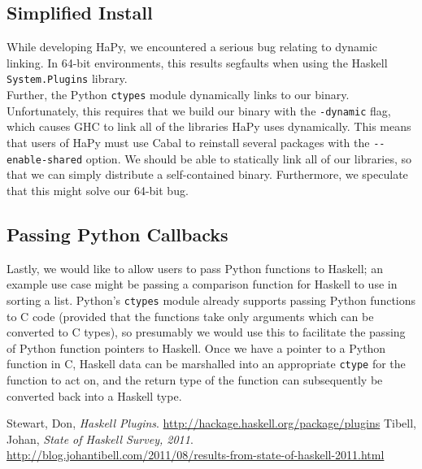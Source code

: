 \documentclass[11pt, letterpaper, oneside, twocolumn] {article}
\begin{document}
\subsection{Simplified Install}\label{sec:simple_install}
While developing HaPy, we encountered a serious bug relating to dynamic linking. In 64-bit environments, this results segfaults when using the Haskell \verb!System.Plugins! library. \\
Further, the Python \verb!ctypes! module dynamically links to our binary. Unfortunately, this requires that we build our binary with the \verb!-dynamic! flag, which causes GHC to link all of the libraries HaPy uses dynamically. This means that users of HaPy must use Cabal to reinstall several packages with the \verb!--enable-shared! option. We should be able to statically link all of our libraries, so that we can simply distribute a self-contained binary. Furthermore, we speculate that this might solve our 64-bit bug.


\subsection{Passing Python Callbacks}
Lastly, we would like to allow users to pass Python functions to Haskell; an example use case might be passing a comparison function for Haskell to use in sorting a list. Python's \verb!ctypes! module already supports passing Python functions to C code (provided that the functions take only arguments which can be converted to C types), so presumably we would use this to facilitate the passing of Python function pointers to Haskell. Once we have a pointer to a Python function in C, Haskell data can be marshalled into an appropriate \verb!ctype! for the function to act on, and the return type of the function can subsequently be converted back into a Haskell type.

\begin{thebibliography}{99}
  Stewart, Don,
  \emph{Haskell Plugins}.
  \url{http://hackage.haskell.org/package/plugins}
  Tibell, Johan,
  \emph{State of Haskell Survey, 2011}.
  \url{http://blog.johantibell.com/2011/08/results-from-state-of-haskell-2011.html}
\end{thebibliography}
\end{document}
